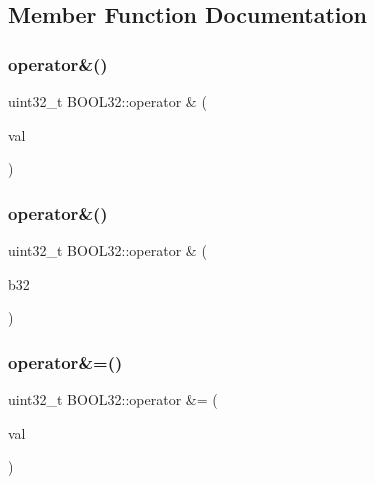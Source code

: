 \subsection{Member Function Documentation}
\hypertarget{struct_b_o_o_l32_aab983a7854c81a513ed5b83cbd250f6e}{}\label{struct_b_o_o_l32_aab983a7854c81a513ed5b83cbd250f6e} 
\subsubsection{\texorpdfstring{operator\&()}{operator\&()}\hspace{0.1cm}{\footnotesize\ttfamily [1/2]}}
{\footnotesize\ttfamily uint32\+\_\+t B\+O\+O\+L32\+::operator \& (\begin{DoxyParamCaption}\item[{const uint32\+\_\+t}]{val }\end{DoxyParamCaption})\hspace{0.3cm}{\ttfamily [inline]}}

\hypertarget{struct_b_o_o_l32_af064fda66fad699a1c5f5272b83b668e}{}\label{struct_b_o_o_l32_af064fda66fad699a1c5f5272b83b668e} 
\subsubsection{\texorpdfstring{operator\&()}{operator\&()}\hspace{0.1cm}{\footnotesize\ttfamily [2/2]}}
{\footnotesize\ttfamily uint32\+\_\+t B\+O\+O\+L32\+::operator \& (\begin{DoxyParamCaption}\item[{const \hyperlink{struct_b_o_o_l32}{B\+O\+O\+L32}}]{b32 }\end{DoxyParamCaption})\hspace{0.3cm}{\ttfamily [inline]}}

\hypertarget{struct_b_o_o_l32_aa1223fee28c9734b7c05d80ad5a976f6}{}\label{struct_b_o_o_l32_aa1223fee28c9734b7c05d80ad5a976f6} 
\subsubsection{\texorpdfstring{operator\&=()}{operator\&=()}\hspace{0.1cm}{\footnotesize\ttfamily [1/2]}}
{\footnotesize\ttfamily uint32\+\_\+t B\+O\+O\+L32\+::operator \&= (\begin{DoxyParamCaption}\item[{const uint32\+\_\+t}]{val }\end{DoxyParamCaption})\hspace{0.3cm}{\ttfamily [inline]}}

